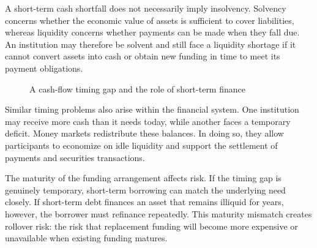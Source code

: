 A short-term cash shortfall does not necessarily imply
insolvency. Solvency concerns whether the economic
value of assets is sufficient to cover liabilities,
whereas liquidity concerns whether payments can be
made when they fall due. An institution may therefore
be solvent and still face a liquidity shortage if it
cannot convert assets into cash or obtain new funding
in time to meet its payment obligations.
\begin{figure}[H]
\centering
{}

\caption{A cash-flow timing gap and the role of short-term finance}
\label{fig:ch7-cash-flow-timing}
\end{figure}

Similar timing problems also arise within the financial
system. One institution may receive more cash than it
needs today, while another faces a temporary deficit.
Money markets redistribute these balances. In doing so,
they allow participants to economize on idle liquidity
and support the settlement of payments and securities
transactions.

The maturity of the funding arrangement affects risk.
If the timing gap is genuinely temporary, short-term
borrowing can match the underlying need closely.
If short-term debt finances an asset that remains
illiquid for years, however, the borrower must refinance
repeatedly. This maturity mismatch creates rollover risk:
the risk that replacement funding will become more
expensive or unavailable when existing funding matures.

